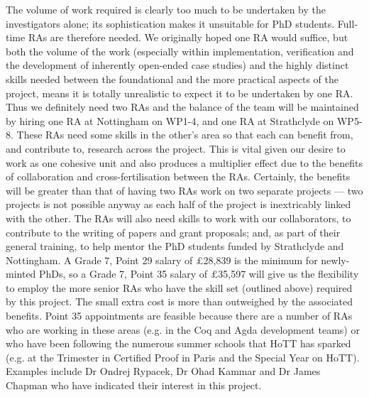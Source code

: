 \documentclass[a4paper,11pt]{article}
\begin{document}
\vspace{0.02in}

The volume of work required is clearly too much to be undertaken by
the investigators alone; its sophistication makes it unsuitable
for PhD students. Full-time RAs are therefore needed. We 
originally hoped one RA would suffice, but both the volume of the
work (especially within implementation, verification and the
development of inherently open-ended case studies) and the highly
distinct skills needed between the foundational and the
more practical aspects of the project, means it is totally unrealistic
to expect it to be undertaken by one RA. Thus we definitely need two
RAs and the balance of the team will be maintained by hiring one RA at
Nottingham on WP1-4, and one RA at Strathclyde on WP5-8. These RAs
need some skills in the other's area so that each can benefit from, and
contribute to, research across the project. This is vital given our
desire to work as one cohesive unit and also produces a multiplier
effect due to the benefits of collaboration and cross-fertilisation
between the RAs. Certainly, the benefits will be greater than that of
having two RAs work on two separate projects --- two 
projects is not possible anyway as each half of the project is
inextricably linked with the other. The RAs will also need skills to
work with our collaborators, to contribute to the writing of papers
and grant proposals; and, as part of their general training, to help
mentor the PhD students funded by Strathclyde and Nottingham.  A Grade
7, Point 29 salary of $\pounds$28,839 is the minimum for newly-minted
PhDs, so a Grade 7, Point 35 salary of $\pounds$35,597 will give us
the flexibility to employ the more senior RAs who have the 
skill set (outlined above) required by this project. The small extra
cost is more than outweighed by the associated benefits. Point 35
appointments are feasible because there are a number of RAs who are
working in these areas (e.g. in the Coq and Agda development teams) or
who have been following the numerous summer schools that HoTT has
sparked (e.g. at the Trimester in Certified Proof in Paris and the
Special Year on HoTT). Examples include Dr Ondrej Rypacek, Dr Ohad Kammar and Dr James
Chapman who have indicated their interest in this project.
\vspace{0.02in}
\end{document}
